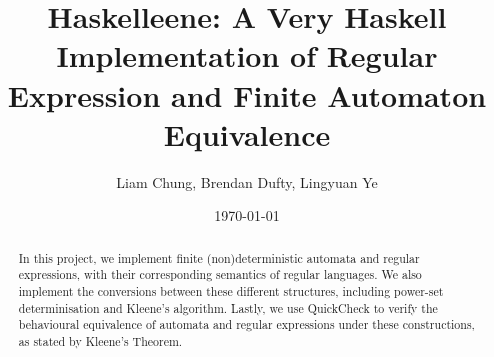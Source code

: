 \documentclass[12pt]{article}
\title{Haskelleene: A Very Haskell Implementation of Regular Expression and
 Finite Automaton Equivalence}
\author{Liam Chung, Brendan Dufty, Lingyuan Ye}
\date{\today}
\begin{document}
\maketitle

\begin{abstract}
In this project, we implement finite (non)deterministic automata and regular expressions, with their corresponding semantics of regular languages. We also implement the conversions between these different structures, including power-set determinisation and Kleene's algorithm. Lastly, we use QuickCheck to verify the behavioural equivalence of automata and regular expressions under these constructions, as stated by Kleene's Theorem.
\end{abstract}

\vfill

\tableofcontents

\clearpage








% 







\end{document}
